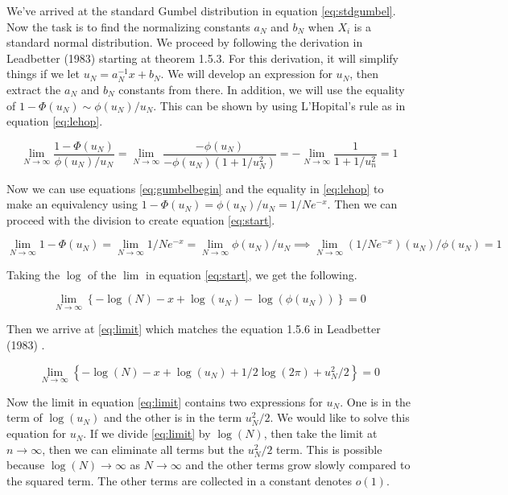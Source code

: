 \documentclass[paper=a4, fontsize=11pt]{article} %
\begin{document}
We've arrived at the standard Gumbel distribution in equation \ref{eq:stdgumbel}. Now the task is to find the normalizing constants \(a_N\) and \(b_N\) when \(X_i\) is a standard normal distribution. We proceed by following the derivation in Leadbetter (1983) \cite{leadbetter} starting at theorem 1.5.3. For this derivation, it will simplify things if we let \(u_N = a_N^{-1} x + b_N\). We will develop an expression for \(u_N\), then extract the \(a_N\) and \(b_N\) constants from there. In addition, we will use the equality of \(1-\Phi(u_N) \sim \phi(u_N) / u_N\). This can be shown by using L'Hopital's rule as in equation \ref{eq:lehop}.

\begin{equation}
\label{eq:lehop}
\lim_{N\rightarrow\infty}\frac{1-\Phi(u_N)}{\phi(u_N)/u_N} = \lim_{N\rightarrow\infty}\frac{-\phi(u_N)}{-\phi(u_N)(1+1/u_N^2)} = -\lim_{N\rightarrow\infty}\frac{1}{1+1/u_n^2} = 1
\end{equation}

Now we can use equations \ref{eq:gumbelbegin} and the equality in \ref{eq:lehop} to make an equivalency using \(1-\Phi(u_N) = \phi(u_N)/u_N = 1/Ne^{-x}\). Then we can proceed with the division to create equation \ref{eq:start}.

\begin{equation}
\label{eq:start}
\lim_{N\rightarrow\infty} 1-\Phi(u_N) = \lim_{N\rightarrow\infty} 1/N e^{-x} = \lim_{N\rightarrow\infty} \phi(u_N)/u_N \implies \lim_{N\rightarrow\infty}(1/Ne^{-x})(u_N)/\phi(u_N) = 1
\end{equation}

Taking the \(\log\) of the \(\lim\) in equation \ref{eq:start}, we get the following.

\begin{equation}
\lim_{N\rightarrow\infty}\left\{-\log(N) - x + \log(u_N) - \log(\phi(u_N))\right\} = 0
\end{equation}

Then we arrive at \ref{eq:limit} which matches the equation 1.5.6 in Leadbetter (1983) \cite{leadbetter}.

\begin{equation}
\label{eq:limit}
\lim_{N\rightarrow\infty}\left\{-\log(N) - x + \log(u_N) + 1/2\log(2\pi) + u_N^2/2\right\} = 0
\end{equation}

Now the limit in equation \ref{eq:limit} contains two expressions for \(u_N\). One is in the term of \(\log(u_N)\) and the other is in the term \(u_N^2/2\). We would like to solve this equation for \(u_N\). If we divide \ref{eq:limit} by \(\log(N)\), then take the limit at \(n\rightarrow\infty\), then we can eliminate all terms but the \(u_N^2/2\) term. This is possible because \(\log(N)\rightarrow\infty\) as \(N\rightarrow\infty\) and the other terms grow slowly compared to the squared term. The other terms are collected in a constant denotes \(o(1)\).
\end{document}
